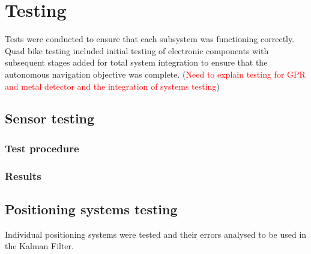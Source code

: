 \documentclass[main.tex]{subfiles}
\begin{document}
\chapter{Testing}
Tests were conducted to ensure that each subsystem was functioning correctly. Quad bike testing included initial testing of electronic components with subsequent stages added for total system integration to ensure that the autonomous navigation objective was complete.
(\textcolor{red}{Need to explain testing for GPR and metal detector and the integration of systems testing})

\section{Sensor testing}
\subsection{Test procedure}
\subsection{Results}

\section{Positioning systems testing}
Individual positioning systems were tested and their errors analysed to be used in the Kalman Filter.
\end{document}
